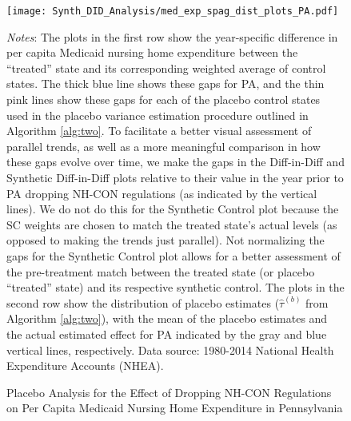 \documentclass[../Main.tex]{subfiles}
\begin{document}
\newpage
\begin{figure}[t]
	\begin{center}
	\caption{\label{fig: med_exp_spag_plots_pa} \centering Placebo Analysis for the Effect of Dropping NH-CON Regulations on Per Capita Medicaid Nursing Home Expenditure in Pennsylvania}
    \texttt{[image: Synth\_DID\_Analysis/med\_exp\_spag\_dist\_plots\_PA.pdf]}
    \end{center}
    \footnotesize
		\textit{Notes}: The plots in the first row show the year-specific difference in per capita Medicaid nursing home expenditure between the ``treated'' state and its corresponding weighted average of control states. The thick blue line shows these gaps for PA, and the thin pink lines show these gaps for each of the placebo control states used in the placebo variance estimation procedure outlined in Algorithm \ref{alg:two}. To facilitate a better visual assessment of parallel trends, as well as a more meaningful comparison in how these gaps evolve over time, we make the gaps in the Diff-in-Diff and Synthetic Diff-in-Diff plots relative to their value in the year prior to PA dropping NH-CON regulations (as indicated by the vertical lines). We do not do this for the Synthetic Control plot because the SC weights are chosen to match the treated state's actual levels (as opposed to making the trends just parallel). Not normalizing the gaps for the Synthetic Control plot allows for a better assessment of the pre-treatment match between the treated state (or placebo ``treated'' state) and its respective synthetic control. The plots in the second row show the distribution of placebo estimates ($\hat{\tau}^{(b)}$ from Algorithm \ref{alg:two}), with the mean of the placebo estimates and the actual estimated effect for PA indicated by the gray and blue vertical lines, respectively. Data source: 1980-2014 National Health Expenditure Accounts (NHEA).
\end{figure}
\clearpage
\end{document}
